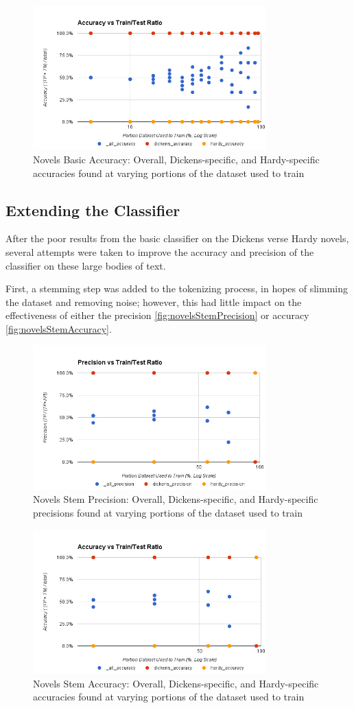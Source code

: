 \begin{figure}[ht!]
    \centering
    \includegraphics[width=90mm]{img/novels_basic-accuracy.png}
    \caption{Novels Basic Accuracy: Overall, Dickens-specific, and Hardy-specific accuracies found at varying portions of the dataset used to train}
    \label{fig:smsBasicAccuracy}
\end{figure}


\subsection{Extending the Classifier}
\label{subsection:advancedResults}
After the poor results from the basic classifier on the Dickens verse Hardy novels, several attempts were taken to
improve the accuracy and precision of the classifier on these large bodies of text.

First, a stemming step was added to the tokenizing process, in hopes of slimming the dataset and removing noise;
however, this had little impact on the effectiveness of either the precision \ref{fig:novelsStemPrecision} or accuracy
\ref{fig:novelsStemAccuracy}.

\begin{figure}[ht!]
    \centering
    \includegraphics[width=90mm]{img/novels_stem-precision.png}
    \caption{Novels Stem Precision: Overall, Dickens-specific, and Hardy-specific precisions found at varying portions of the dataset used to train}
    \label{fig:spamBasicPrecision}
\end{figure}

\begin{figure}[ht!]
    \centering
    \includegraphics[width=90mm]{img/novels_stem-accuracy.png}
    \caption{Novels Stem Accuracy: Overall, Dickens-specific, and Hardy-specific accuracies found at varying portions of the dataset used to train}
    \label{fig:smsBasicAccuracy}
\end{figure}
